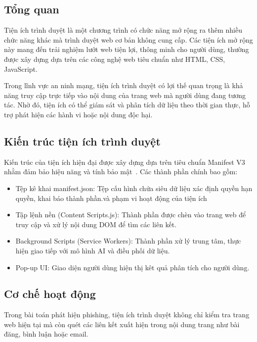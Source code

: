 \subsection{Tổng quan}
Tiện ích trình duyệt là một chương trình có chức năng mở rộng ra thêm nhiều chức năng khác mà trình duyệt web cơ bản không cung cấp. Các tiện ích mở rộng này mang đến trải nghiệm lướt web tiện lợi, thông minh cho người dùng, thường được xây dựng dựa trên các công nghệ web tiêu chuẩn như HTML, CSS, JavaScript.

Trong lĩnh vực an ninh mạng, tiện ích trình duyệt có lợi thế quan trọng là khả năng truy cập trực tiếp vào nội dung của trang web mà người dùng đang tương tác. Nhờ đó, tiện ích có thể giám sát và phân tích dữ liệu theo thời gian thực, hỗ trợ phát hiện các hành vi hoặc nội dung độc hại.

\subsection{Kiến trúc tiện ích trình duyệt}
Kiến trúc của tiện ích hiện đại được xây dựng dựa trên tiêu chuẩn Manifest V3 nhằm đảm bảo hiệu năng và tính bảo mật~\cite{ref9}. Các thành phần chính bao gồm:

\begin{itemize}
    \item Tệp kê khai manifest.json: Tệp cấu hình chứa siêu dữ liệu xác định quyền hạn quyền, khai báo thành phần.và phạm vi hoạt động của tiện ích
    
    \item Tập lệnh nền (Content Scripts.js): Thành phần được chèn vào trang web để truy cập và xử lý nội dung DOM  để tìm các liên kết.
    
    \item Background Scripts (Service Workers): Thành phần xử lý trung tâm, thực hiện giao tiếp với mô hình AI và điều phối dữ liệu.
    
    \item Pop-up UI: Giao diện người dùng hiện thị kêt quả phân tích cho người dùng.
    
\end{itemize}

\subsection{Cơ chế hoạt động }
Trong bài toán phát hiện phishing, tiện ích trình duyệt không chỉ kiểm tra trang web hiện tại mà còn quét các liên kết xuất hiện trong nội dung trang như bài đăng, bình luận hoặc email.

